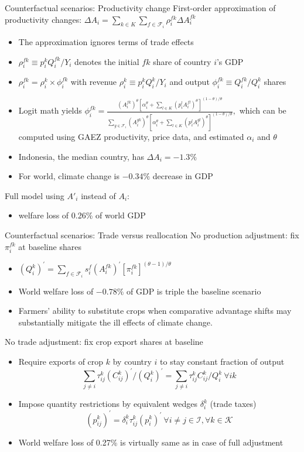 \documentclass[11pt,notes=hide,aspectratio=169]{beamer}
\begin{document}
\begin{frame}{Counterfactual scenarios: Productivity change}
First-order approximation of productivity changes: $\Delta A_i = \sum_{k \in K} \sum_{f \in \mathcal{F}_i} \rho_i^{fk} \Delta A_i^{fk}$
\begin{itemize}
\item The approximation ignores terms of trade effects
\item
$\rho_i^{fk} \equiv p_i^k Q_i^{fk} / Y_i$  denotes the initial $fk$ share of country $i$'s GDP
\item
$\rho_i^{fk} = \rho_i^k \times \phi_i^{fk}$ with revenue $\rho_i^k \equiv p_i^k Q_i^k / Y_i $ and output $\phi_i^{fk} \equiv Q_i^{fk} / Q_i^k$ shares
\item Logit math yields
$\phi_i^{fk} = \frac{(A_i^{fk})^\theta[\alpha_i^\theta + \sum_{l\in K} (p_i^l A_i^{fl})^\theta]^{(1-\theta)/\theta}}{\sum_{g\in\mathcal{F}_i} (A_i^{gk})^\theta[\alpha_i^\theta + \sum_{l\in K} (p_i^l A_i^{gl})^\theta]^{(1-\theta)/\theta}},$
which can be computed using GAEZ productivity, price data, and estimated $\alpha_i$ and $\theta$
\item Indonesia, the median country, has $\Delta A_i = - 1.3\%$
\item For world, climate change is $-0.34\%$ decrease in GDP
\end{itemize}
Full model using $A'_i$ instead of $A_i$: 
\begin{itemize}
\item welfare loss of 0.26\% of world GDP
\end{itemize}
\end{frame}
\begin{frame}{Counterfactual scenarios: Trade versus reallocation}
No production adjustment: fix $\pi_i^{fk}$ at baseline shares
\begin{itemize}
\item $(Q_i^k)^{'} = \sum_{f \in \mathcal{F}_i} s_i^f (A_i^{fk})^{'} \left[ \pi_i^{fk} \right]^{(\theta-1)/\theta}$
\item World welfare loss of $-0.78\%$ of GDP is triple the baseline scenario
\item Farmers' ability to substitute crops when comparative advantage shifts may substantially mitigate the ill effects of climate change.
\end{itemize}
No trade adjustment: fix crop export shares at baseline
\begin{itemize}
\item Require exports of crop $k$ by country $i$ to stay constant fraction of output
$$\sum_{j\neq i} \tau_{ij}^k (C_{ij}^k)^{'} / (Q_i^k)^{'} = \sum_{j\neq i} \tau_{ij}^k C_{ij}^k/ Q_i^k  \ \forall ik$$
\item Impose quantity restrictions by equivalent wedges $\delta_i^k$ (trade taxes)
$$(p_{ij}^k)^{'} = \delta_i^k \tau_{ij}^k (p_i^k)^{'} \ \forall i \neq j \in \mathcal{I}, \forall k \in \mathcal{K}$$
\item World welfare loss of 0.27\% is virtually same as in case of full adjustment
\end{itemize}
\end{frame}
\end{document}
